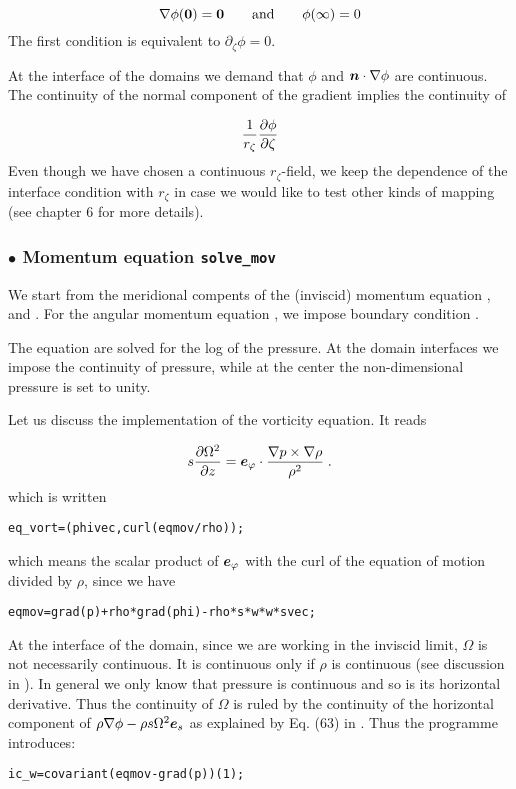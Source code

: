 \[ \na\phi(\vzero) = \vzero  \andet \phi(\infty) = 0\]
The first condition is equivalent to $\partial_\zeta\phi=0$.

At the interface of the domains we demand that $\phi$ and $\vn\cdot\na\phi$
are continuous. The continuity of the normal component of the gradient implies
the continuity of

\[ \frac{1}{r_\zeta}\frac{\partial \phi}{\partial \zeta}\]
Even though we have chosen a continuous $r_\zeta$-field, we keep the
dependence of the interface condition with $r_\zeta$ in case we would like to
test other kinds of mapping (see chapter 6 for more details).

\subsubsection{$\bullet$ \bf Momentum equation {\tt solve\_mov}}

We start from the meridional compents of the (inviscid) momentum equation
,  and . For the angular momentum
equation , we impose boundary condition .

The equation are solved for the log of the pressure. At the domain
interfaces we impose the continuity of pressure, while at the center the
non-dimensional pressure is set to unity.

Let us discuss the implementation of the vorticity equation. It reads

\[ s\frac{\partial\Omega^2}{\partial z}=\ephi\cdot\frac{\na
p\times\na\rho}{\rho^2} \;.
\]
which is written

\centerline{\tt eq\_vort=(phivec,curl(eqmov/rho));}
\bigskip
\noindent which means the scalar product of $\ephi$ with the curl of
the equation of motion divided by $\rho$, since we have

\bigskip
\centerline{\tt eqmov=grad(p)+rho*grad(phi)-rho*s*w*w*svec;}
\bigskip

At the interface of the domain, since we are working in the inviscid
limit, $\Omega$ is not necessarily continuous. It is continuous only if
$\rho$ is continuous (see discussion in \citealt{ELR13}). In general we
only know that pressure is continuous and so is its horizontal
derivative. Thus the continuity of $\Omega$ is ruled by the continuity
of the horizontal component of $\rho\na\phi-\rho s\Omega^2\es$ as
explained by Eq. (63) in \cite{ELR13}. Thus the programme introduces:

\bigskip
\centerline{\tt ic\_w=covariant(eqmov-grad(p))(1);
}
\bigskip

